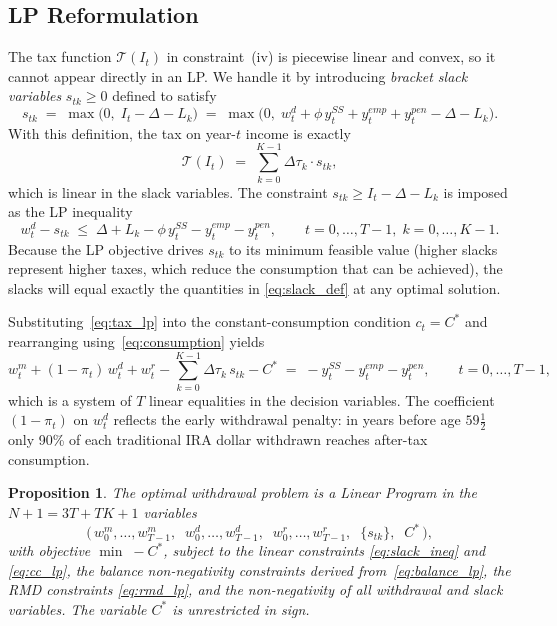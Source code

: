 \documentclass[12pt]{article}
\newtheorem{proposition}{Proposition}
\newcommand{\Tax}{\mathcal{T}}
\newcommand{\Copt}{C^{*}}
\begin{document}
\subsection{LP Reformulation}
\label{sec:lp}

The tax function $\Tax(I_t)$ in constraint~(iv) is piecewise linear and
convex, so it cannot appear directly in an LP. We handle it by introducing
\emph{bracket slack variables} $s_{tk} \geq 0$ defined to satisfy
\begin{equation}
  s_{tk} \;=\; \max\!\bigl(0,\; I_t - \Delta - L_k\bigr)
         \;=\; \max\!\bigl(0,\; w^d_t + \phi\,y^{SS}_t + y^{emp}_t + y^{pen}_t - \Delta - L_k\bigr).
  \label{eq:slack_def}
\end{equation}
With this definition, the tax on year-$t$ income is exactly
\begin{equation}
  \Tax(I_t) \;=\; \sum_{k=0}^{K-1} \Delta\tau_k \cdot s_{tk},
  \label{eq:tax_lp}
\end{equation}
which is linear in the slack variables. The constraint
$s_{tk} \geq I_t - \Delta - L_k$ is imposed as the LP inequality
\begin{equation}
  w^d_t - s_{tk} \;\leq\; \Delta + L_k - \phi\,y^{SS}_t - y^{emp}_t - y^{pen}_t,
  \qquad t = 0,\ldots,T-1,\; k = 0,\ldots,K-1.
  \label{eq:slack_ineq}
\end{equation}
Because the LP objective drives $s_{tk}$ to its minimum feasible value
(higher slacks represent higher taxes, which reduce the consumption that
can be achieved), the slacks will equal exactly the quantities in
\eqref{eq:slack_def} at any optimal solution.

Substituting~\eqref{eq:tax_lp} into the constant-consumption condition
$c_t = \Copt$ and rearranging using~\eqref{eq:consumption} yields
\begin{equation}
  w^m_t + (1-\pi_t)\,w^d_t + w^r_t
  - \sum_{k=0}^{K-1} \Delta\tau_k\, s_{tk} - \Copt
  \;=\; -y^{SS}_t - y^{emp}_t - y^{pen}_t,
  \qquad t = 0,\ldots,T-1,
  \label{eq:cc_lp}
\end{equation}
which is a system of $T$ linear equalities in the decision variables.
The coefficient $(1-\pi_t)$ on $w^d_t$ reflects the early withdrawal penalty:
in years before age $59\tfrac{1}{2}$ only 90\% of each traditional IRA dollar
withdrawn reaches after-tax consumption.

\begin{proposition}
  The optimal withdrawal problem is a Linear Program in the
  $N + 1 = 3T + TK + 1$ variables
  \[
    \bigl(\,w^m_0,\ldots,w^m_{T-1},\;\;
          w^d_0,\ldots,w^d_{T-1},\;\;
          w^r_0,\ldots,w^r_{T-1},\;\;
          \{s_{tk}\},\;\;
          \Copt\,\bigr),
  \]
  with objective $\min\; -\Copt$, subject to the linear constraints
  \eqref{eq:slack_ineq} and \eqref{eq:cc_lp}, the balance non-negativity
  constraints derived from~\eqref{eq:balance_lp}, the RMD constraints
  \eqref{eq:rmd_lp}, and the non-negativity of all withdrawal and slack
  variables. The variable $\Copt$ is unrestricted in sign.
\end{proposition}
\end{document}
